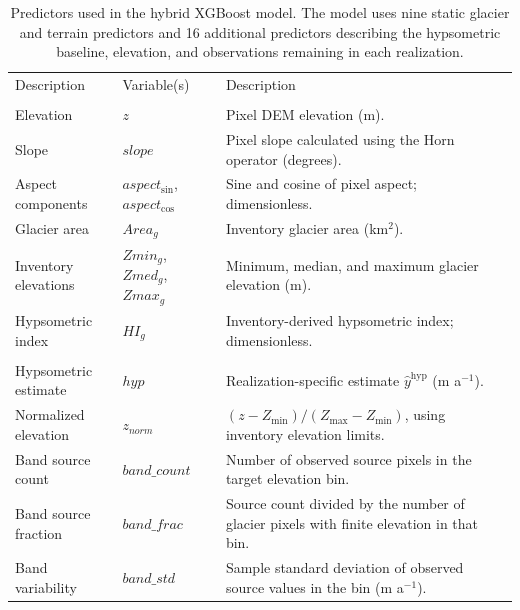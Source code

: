 \begin{table}[t]
\caption{Predictors used in the hybrid XGBoost model. The model uses nine static glacier and terrain predictors and 16 additional predictors describing the hypsometric baseline, elevation, and observations remaining in each realization.}
\label{tab:features}
\centering
\small
\begin{tabular}{p{}p{}p{}}
\tophline
Description & Variable(s) & Description \\
\middlehline
\multicolumn{3}{l}{Static glacier and terrain predictors (9)} \\
\middlehline
\rowcolor[gray]{0.94}
Elevation & $z$ & Pixel DEM elevation (m). \\

Slope & $slope$ & Pixel slope calculated using the Horn operator (degrees). \\

\rowcolor[gray]{0.94}
Aspect components & $aspect_{\sin}$, $aspect_{\cos}$ & Sine and cosine of pixel aspect; dimensionless. \\

Glacier area & $Area_g$ & Inventory glacier area (km$^2$). \\

\rowcolor[gray]{0.94}
Inventory elevations & $Zmin_g$, $Zmed_g$, $Zmax_g$ & Minimum, median, and maximum glacier elevation (m). \\

Hypsometric index & $HI_g$ & Inventory-derived hypsometric index; dimensionless. \\
\middlehline
\multicolumn{3}{l}{Additional predictors (16)} \\
\middlehline
\rowcolor[gray]{0.94}
Hypsometric estimate & $hyp$ & Realization-specific estimate $\widehat y^{\mathrm{hyp}}$ (m a$^{-1}$). \\

Normalized elevation &$z_{norm}$ & $(z-Z_{\mathrm{min}})/(Z_{\mathrm{max}}-Z_{\mathrm{min}})$, using inventory elevation limits. \\
\rowcolor[gray]{0.94}
Band source count & $band\_count$ & Number of observed source pixels in the target elevation bin. \\

Band source fraction & $band\_frac$ & Source count divided by the number of glacier pixels with finite elevation in that bin. \\
\rowcolor[gray]{0.94}
Band variability & $band\_std$ & Sample standard deviation of observed source values in the bin (m a$^{-1}$). \\


\end{tabular}
\end{table}
